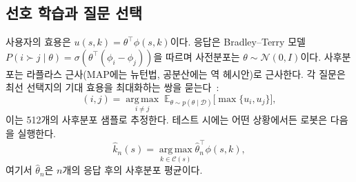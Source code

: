 \subsection{선호 학습과 질문 선택}
\label{sec:preference}
사용자의 효용은 $u(s,k) = \theta^\top \phi(s,k)$이다. 응답은 Bradley--Terry 모델~\citep{bradley1952rank}
$P(i \succ j \mid \theta) = \sigma(\theta^\top(\phi_i - \phi_j))$을 따르며 사전분포는 $\theta \sim \mathcal{N}(0, I)$이다.
사후분포는 라플라스 근사(MAP에는 뉴턴법, 공분산에는 역 헤시안)로 근사한다.
각 질문은 최선 선택지의 기대 효용을 최대화하는 쌍을 묻는다~\citep{astudillo2023qeubo}:
\begin{equation}
  (i,j) = \operatorname*{arg\,max}_{i \ne j} \; \mathbb{E}_{\theta \sim p(\theta \mid \mathcal{D})}\bigl[\max\{u_i, u_j\}\bigr],
\end{equation}
이는 512개의 사후분포 샘플로 추정한다. 테스트 시에는 어떤 상황에서든 로봇은 다음을 실행한다.
\begin{equation}
  \hat k_n(s) = \operatorname*{arg\,max}_{k \in \mathcal{C}(s)} \hat\theta_n^{\top}\phi(s,k),
  \label{eq:exec}
\end{equation}
여기서 $\hat\theta_n$은 $n$개의 응답 후의 사후분포 평균이다.


